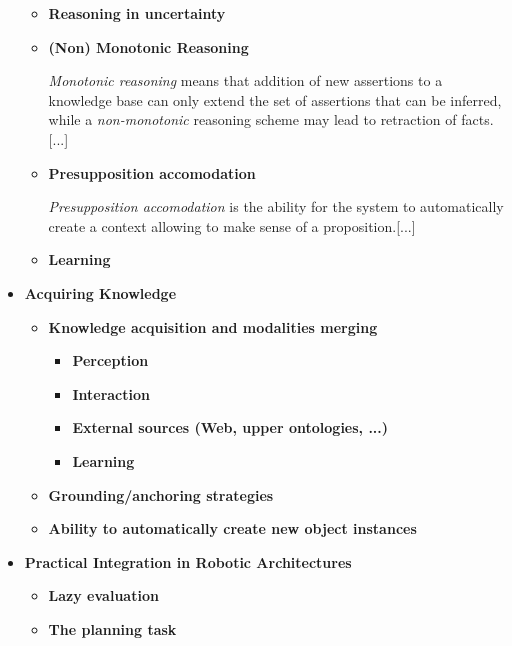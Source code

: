 \documentclass[a4paper]{article}
\begin{document}
\begin{itemize}
\begin{itemize}
        \item{\bf Reasoning in uncertainty}

        \item{\bf (Non) Monotonic Reasoning}

        \emph{Monotonic reasoning} means that addition of new assertions to a knowledge base
        can only extend the set of assertions that can be inferred, while a
        \emph{non-monotonic} reasoning scheme may lead to retraction of facts.
        [...]

        \item{\bf Presupposition accomodation}

        \emph{Presupposition accomodation} is the ability for the system to
        automatically create a context allowing to make sense of a proposition.[...]

        \item{\bf Learning}
    \end{itemize}

    \item{\bf Acquiring Knowledge}

    \begin{itemize}
        \item{\bf Knowledge acquisition and modalities merging}
        \begin{itemize}
            \item{\bf Perception}
            \item{\bf Interaction}
            \item{\bf External sources (Web, upper ontologies, ...)}
            \item{\bf Learning}
        \end{itemize}

        \item{\bf Grounding/anchoring strategies}

        \item{\bf Ability to automatically create new object instances}
    \end{itemize}

\item{\bf Practical Integration in Robotic Architectures}

    \begin{itemize}
        \item{\bf Lazy evaluation}

        \item{\bf The planning task}


\end{itemize}
\end{itemize}
\end{document}
